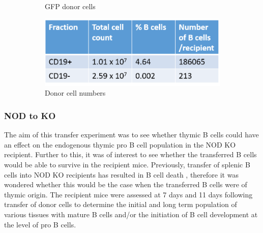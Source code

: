 \begin{figure}
\begin{subfigure}{0.5\textwidth}
	\caption{GFP donor cells}
	\label{subfig:GFPdonorseparation}
	\end{subfigure}
	\begin{subfigure}{0.5\textwidth}
	\centering
	\includegraphics[width=\textwidth]{Figures/GFPdonortable2.png}
	\caption{Donor cell numbers}
	\label{subfig:GFPdonortable}
	\end{subfigure}
\caption[Experimental setup and donor cell populations for transfer experiments]{}
\label{}
\end{figure}
	
	

	
	

\subsubsection{NOD to KO}

The aim of this transfer experiment was to see whether thymic B cells could have an effect on the endogenous thymic pro B cell population in the NOD KO recipient.
Further to this, it was of interest to see whether the transferred B cells would be able to survive in the recipient mice.
Previously, transfer of splenic B cells into NOD KO recipients has resulted in B cell death \citep{Serreze1998}, therefore it was wondered whether this would be the case when the transferred B cells were of thymic origin.
The recipient mice were assessed at 7 days and 11 days following transfer of donor cells to determine the initial and long term population of various tissues with mature B cells and/or the initiation of B cell development at the level of pro B cells.


